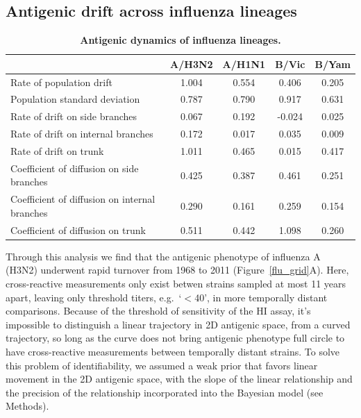 \documentclass[11pt,oneside,letterpaper]{article}
\begin{document}
\subsection*{Antigenic drift across influenza lineages}

\begin{table}[tb]
	\centering
	\caption{\textbf{Antigenic dynamics of influenza lineages.}}
	\label{errortable}
	\begin{tabular}{ l c c c c } 
	\hline
	 													&	A/H3N2	& 	A/H1N1 	& 	B/Vic	& 	B/Yam	\\
	\hline	
	Rate of population drift 							&	1.004	&	0.554	&	0.406	&	0.205	\\
	Population standard deviation 						&	0.787	&	0.790	&	0.917	&	0.631	\\

	Rate of drift on side branches						&	0.067	&	0.192	&	-0.024	&	0.025	\\	
	Rate of drift on internal branches					&	0.172	&	0.017	&	0.035	&	0.009	\\
	Rate of drift on trunk								&	1.011	&	0.465	&	0.015	&	0.417	\\

	Coefficient of diffusion on side branches 			&	0.425	&	0.387	&	0.461	&	0.251	\\
	Coefficient of diffusion on internal branches		&	0.290	&	0.161	&	0.259	&	0.154	\\
	Coefficient of diffusion on trunk  					&	0.511	&	0.442 	&	1.098	&	0.260	\\	
	\hline
	\end{tabular}
\end{table}

Through this analysis we find that the antigenic phenotype of influenza A (H3N2) underwent rapid turnover from 1968 to 2011 (Figure~\ref{flu_grid}A).  
Here, cross-reactive measurements only exist betwen strains sampled at most 11 years apart, leaving only threshold titers, e.g.\ `$<$40', in more temporally distant comparisons.  
Because of the threshold of sensitivity of the HI assay, it's impossible to distinguish a linear trajectory in 2D antigenic space, from a curved trajectory, so long as the curve does not bring antigenic phenotype full circle to have cross-reactive measurements between temporally distant strains.
To solve this problem of identifiability, we assumed a weak prior that favors linear movement in the 2D antigenic space, with the slope of the linear relationship and the precision of the relationship incorporated into the Bayesian model (see Methods).
\end{document}

